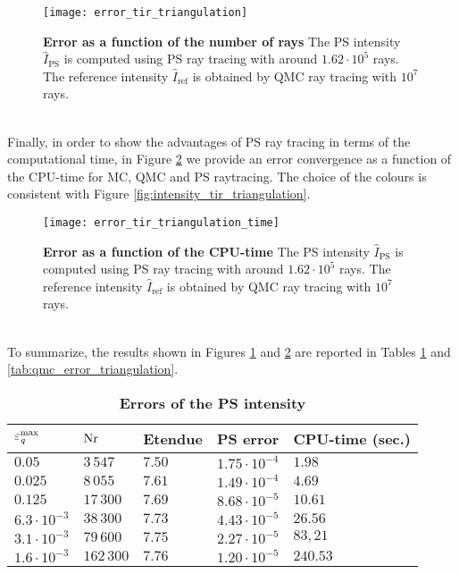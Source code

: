  \begin{figure}[ht]
  \center
  \texttt{[image: error\_tir\_triangulation]}
  \caption{\textbf{Error as a function of the number of rays} The PS intensity $\hat{I}_{\textrm{PS}}$ is computed using PS ray tracing with around $1.62\cdot 10^5$ rays. The reference intensity $\hat{I}_{\textrm{ref}}$ is obtained by QMC ray tracing with $10^7$ rays.}
  \label{fig:error_tir_triangulation}
\end{figure}
\\ \indent Finally, in order to show the advantages of PS ray tracing in terms of the computational time, in Figure \ref{fig:error_tir_triangulation_time} we provide an error convergence as a function of the CPU-time for MC, QMC and PS raytracing. The choice of the colours is consistent with Figure \ref{fig:intensity_tir_triangulation}.
\begin{figure}[ht]
  \center
  \texttt{[image: error\_tir\_triangulation\_time]}
  \caption{\textbf{Error as a function of the CPU-time} The PS intensity $\hat{I}_{\textrm{PS}}$ is computed using PS ray tracing with around $1.62\cdot 10^5$ rays. The reference intensity $\hat{I}_{\textrm{ref}}$ is obtained by QMC ray tracing with $10^7$ rays.}
  \label{fig:error_tir_triangulation_time}
\end{figure}
\\ \indent To summarize, the results shown in Figures \ref{fig:error_tir_triangulation} and \ref{fig:error_tir_triangulation_time} are reported in Tables \ref{tab:ps_error_triangulation} and  \ref{tab:qmc_error_triangulation}.
\begin{table}[ht] \label{tab:table_tir_triangulation}
\centering
\caption{\bf Errors of the PS intensity}
\begin{tabular}{lllll}
 \hline   $\varepsilon_{\textit{q}}^{\textrm{max}} $  & $\textrm{Nr}$ & Etendue & PS error & CPU-time (sec.) \\
  \hline 
 $0.05$ & $3\,547$   & $7.50$   &  $1.75\cdot10^{-4}$ & $1.98$\\
$0.025$  & $8\,055$    & $7.61$    & $1.49\cdot 10^{-4}$ & $4.69$ \\
$0.125$  & $17\,300$    & $7.69$  & $8.68\cdot 10^{-5}$ & $10.61$\\
 $6.3 \cdot 10^{-3}$  & $38\,300$  & $7.73$   & $4.43\cdot 10^{-5}$ & $26.56$\\
 $3.1 \cdot 10^{-3}$ & $79\,600$  & $7.75$    & $2.27\cdot 10^{-5}$ & $83,21$\\
$1.6 \cdot 10^{-3}$ & $162\,300$  & $7.76$    & $1.20\cdot 10^{-5}$ & $240.53$\\
 \hline
 \end{tabular}
 \label{tab:ps_error_triangulation}
 \end{table}
